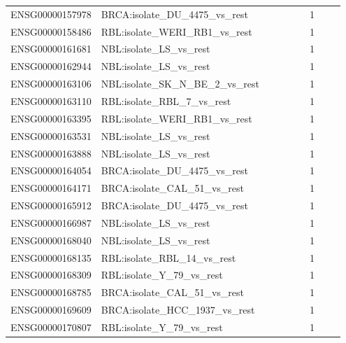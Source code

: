 \begin{landscape}
{\begin{longtable}{p{0.18\linewidth}p{0.65\linewidth}p{0.12\linewidth}}
ENSG00000157978 & BRCA:isolate\_\allowbreak{}DU\_\allowbreak{}4475\_\allowbreak{}vs\_\allowbreak{}rest & 1 \\
ENSG00000158486 & RBL:isolate\_\allowbreak{}WERI\_\allowbreak{}RB1\_\allowbreak{}vs\_\allowbreak{}rest & 1 \\
ENSG00000161681 & NBL:isolate\_\allowbreak{}LS\_\allowbreak{}vs\_\allowbreak{}rest & 1 \\
ENSG00000162944 & NBL:isolate\_\allowbreak{}LS\_\allowbreak{}vs\_\allowbreak{}rest & 1 \\
ENSG00000163106 & NBL:isolate\_\allowbreak{}SK\_\allowbreak{}N\_\allowbreak{}BE\_\allowbreak{}2\_\allowbreak{}vs\_\allowbreak{}rest & 1 \\
ENSG00000163110 & RBL:isolate\_\allowbreak{}RBL\_\allowbreak{}7\_\allowbreak{}vs\_\allowbreak{}rest & 1 \\
ENSG00000163395 & RBL:isolate\_\allowbreak{}WERI\_\allowbreak{}RB1\_\allowbreak{}vs\_\allowbreak{}rest & 1 \\
ENSG00000163531 & NBL:isolate\_\allowbreak{}LS\_\allowbreak{}vs\_\allowbreak{}rest & 1 \\
ENSG00000163888 & NBL:isolate\_\allowbreak{}LS\_\allowbreak{}vs\_\allowbreak{}rest & 1 \\
ENSG00000164054 & BRCA:isolate\_\allowbreak{}DU\_\allowbreak{}4475\_\allowbreak{}vs\_\allowbreak{}rest & 1 \\
ENSG00000164171 & BRCA:isolate\_\allowbreak{}CAL\_\allowbreak{}51\_\allowbreak{}vs\_\allowbreak{}rest & 1 \\
ENSG00000165912 & BRCA:isolate\_\allowbreak{}DU\_\allowbreak{}4475\_\allowbreak{}vs\_\allowbreak{}rest & 1 \\
ENSG00000166987 & NBL:isolate\_\allowbreak{}LS\_\allowbreak{}vs\_\allowbreak{}rest & 1 \\
ENSG00000168040 & NBL:isolate\_\allowbreak{}LS\_\allowbreak{}vs\_\allowbreak{}rest & 1 \\
ENSG00000168135 & RBL:isolate\_\allowbreak{}RBL\_\allowbreak{}14\_\allowbreak{}vs\_\allowbreak{}rest & 1 \\
ENSG00000168309 & RBL:isolate\_\allowbreak{}Y\_\allowbreak{}79\_\allowbreak{}vs\_\allowbreak{}rest & 1 \\
ENSG00000168785 & BRCA:isolate\_\allowbreak{}CAL\_\allowbreak{}51\_\allowbreak{}vs\_\allowbreak{}rest & 1 \\
ENSG00000169609 & BRCA:isolate\_\allowbreak{}HCC\_\allowbreak{}1937\_\allowbreak{}vs\_\allowbreak{}rest & 1 \\
ENSG00000170807 & RBL:isolate\_\allowbreak{}Y\_\allowbreak{}79\_\allowbreak{}vs\_\allowbreak{}rest & 1 \\

\end{longtable}}
\end{landscape}
